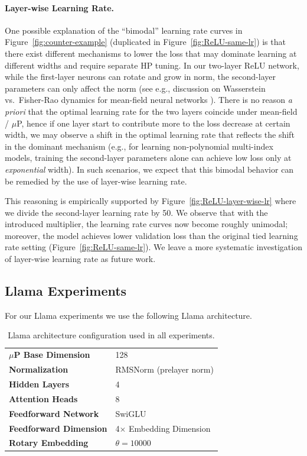 \paragraph{Layer-wise Learning Rate.}
One possible explanation of the ``bimodal'' learning rate curves in Figure~\ref{fig:counter-example} (duplicated in Figure~\ref{fig:ReLU-same-lr}) is that there exist different mechanisms to lower the loss that may dominate learning at different widths and require separate HP tuning. In our two-layer ReLU network, while the first-layer neurons can rotate and grow in norm, the second-layer parameters can only affect the norm (see e.g., discussion on Wasserstein vs.~Fisher-Rao dynamics for mean-field neural networks \citep{chizat2022sparse}). There is no reason \textit{a priori} that the optimal learning rate for the two layers coincide under mean-field / $\mu$P, hence if one layer start to contribute more to the loss decrease at certain width, we may observe a shift in the optimal learning rate that reflects the shift in the dominant mechanism (e.g., for learning non-polynomial multi-index models, training the second-layer parameters alone can achieve low loss only at \textit{exponential} width). In such scenarios, we expect that this bimodal behavior can be remedied by the use of layer-wise learning rate.  

This reasoning is empirically supported by Figure~\ref{fig:ReLU-layer-wise-lr} where we divide the second-layer learning rate by 50. We observe that with the introduced multiplier, the learning rate curves now become roughly unimodal; moreover, the model achieves lower validation loss than the original tied learning rate setting (Figure~\ref{fig:ReLU-same-lr}). 
We leave a more systematic investigation of layer-wise learning rate as future work. 

\newpage
\subsection{Llama Experiments}\label{app:llama_exps}
For our Llama experiments we use the following Llama architecture.

\begin{table}[ht]
\centering
\small
\renewcommand{\arraystretch}{1.2}
\begin{tabular}{@{}ll@{}}
\toprule
\textbf{$\mu$P Base Dimension} & 128 \\
\addlinespace
\textbf{Normalization} & RMSNorm (prelayer norm) \\
\addlinespace
\textbf{Hidden Layers} & 4 \\
\addlinespace
\textbf{Attention Heads} & 8 \\
\addlinespace
\textbf{Feedforward Network} & SwiGLU\\
\addlinespace
\textbf{Feedforward Dimension} & 4$\times$ Embedding Dimension\\
\addlinespace
\textbf{Rotary Embedding} & $\theta = 10000$ \\
\bottomrule
\end{tabular}
\caption{Llama architecture configuration used in all experiments.}
\end{table}


